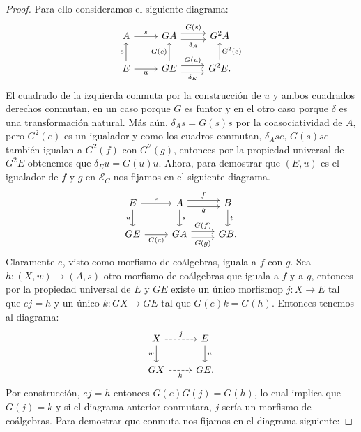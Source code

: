 \begin{proof}
  Para ello consideramos el siguiente diagrama:
  \begin{equation*}
    \begin{tikzcd}
      A\ar{r}{s} & GA\ar[shift left=0.75ex]{r}{G(s)}\ar[swap, shift right=0.75ex]{r}{\delta_A} & G^2A \\
      E\ar{u}{e}\ar[swap]{r}{u} & GE\ar[shift left=0.75ex]{r}{G(u)}\ar[swap, shift right=0.75ex]{r}{\delta_E}\ar{u}{G(e)} & G^2E.\ar[swap]{u}{G^2(e)}
    \end{tikzcd}
  \end{equation*}
  El cuadrado de la izquierda conmuta por la construcción de $u$ y ambos cuadrados derechos conmutan, en un caso
  porque $G$ es funtor y en el otro caso porque $\delta$ es una transformación natural. Más aún, $\delta_As=G(s)s$
  por la coasociatividad de $A$, pero $G^2(e)$ es un igualador y como los cuadros conmutan, $\delta_Ase$, $G(s)se$
  también igualan a $G^2(f)$ con $G^2(g)$, entonces por la propiedad universal
  de $G^2E$ obtenemos que $\delta_Eu=G(u)u$. Ahora, para demostrar que $(E,u)$ es el
  igualador de $f$ y $g$ en $\mathcal{E}_C$ nos fijamos en el siguiente diagrama.
  \begin{equation*}
    \begin{tikzcd}
      E\ar{r}{e}\ar[swap]{d}{u} & A\ar[shift left=0.75ex]{r}{f}\ar[swap, shift right=0.75ex]{r}{g}\ar{d}{s} & B\ar{d}{t} \\
      GE\ar[swap]{r}{G(e)} & GA\ar[shift left=0.75ex]{r}{G(f)}\ar[swap, shift right=0.75ex]{r}{G(g)} & GB.
    \end{tikzcd}
  \end{equation*}
  Claramente $e$, visto como morfismo de coálgebras, iguala a $f$ con $g$. Sea $h\colon (X,w)\to (A,s)$ otro morfismo
  de coálgebras que iguala a $f$ y a $g$, entonces por la propiedad universal de
  $E$ y $GE$ existe un único morfismop $j\colon X\to E$ tal que $ej=h$ y un único $k\colon GX\to GE$ tal que $G(e)k=G(h)$. Entonces tenemos al diagrama:
  \begin{equation*}
    \begin{tikzcd}
      X\ar[dashed]{r}{j}\ar[swap]{d}{w} & E\ar{d}{u} \\
      GX\ar[swap,dashed]{r}{k} & GE.
    \end{tikzcd}
  \end{equation*}
  Por construcción, $ej=h$ entonces $G(e)G(j)=G(h)$, lo cual implica que $G(j)=k$ y si el diagrama anterior conmutara, 
  $j$ sería un morfismo de coálgebras. Para demostrar que conmuta nos fijamos en el diagrama siguiente:

\end{proof}
